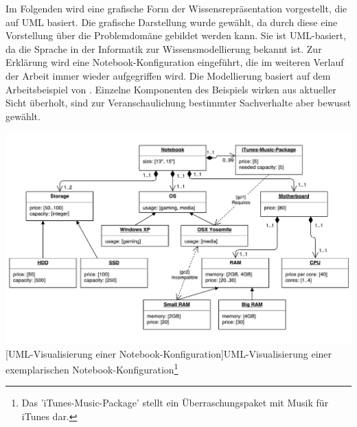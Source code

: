 \documentclass[11pt, a4paper, titlepage, listof=totoc, bibliography=totoc, index=totoc, twoside, openright, headings=normal]{scrreprt}
\begin{document}
Im Folgenden wird eine grafische Form der Wissensrepräsentation vorgestellt, die auf UML basiert. Die grafische Darstellung wurde gewählt, da durch diese eine Vorstellung über die Problemdomäne gebildet werden kann. Sie ist UML-basiert, da die Sprache in der Informatik zur Wissensmodellierung bekannt ist. Zur Erklärung wird eine Notebook-Konfiguration eingeführt, die im weiteren Verlauf der Arbeit immer wieder aufgegriffen wird. Die Modellierung basiert auf dem Arbeitsbeispiel von \citep{felferning14}. Einzelne Komponenten des Beispiels wirken aus aktueller Sicht überholt, sind zur Veranschaulichung bestimmter Sachverhalte aber bewusst gewählt.

\vspace{1em}
\begin{minipage}{\linewidth}
	\centering
	\includegraphics[width=1\linewidth]{Abbildungen/notebookConfigurationUML.pdf}
	[UML-Visualisierung einer Notebook-Konfiguration]{UML-Visualisierung einer exemplarischen Notebook-Konfiguration\footnote{Das 'iTunes-Music-Package' stellt ein Überraschungspaket mit Musik für iTunes dar.}}
	\label{fig:notebookConfigurationUML}
\end{minipage}
\vspace{1em}
\end{document}
